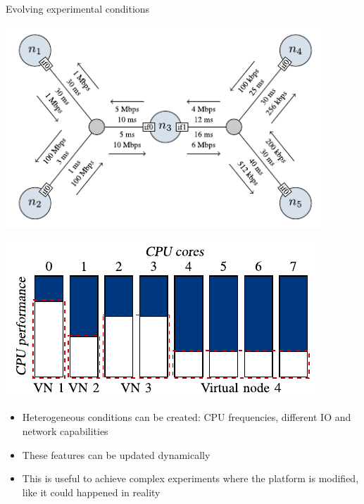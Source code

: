 \documentclass[11pt,xcolor=dvipsnames,presentation]{beamer}
\begin{document}
\begin{frame}[label=sec-4-0-5]{Evolving experimental conditions}

\begin{minipage}{0.5\textwidth}
\begin{center}
    \includegraphics[width=0.9\textwidth]{figures/links}
\end{center}\end{minipage}\hfill
\begin{minipage}{0.5\textwidth}
\begin{center}
    \includegraphics[width=\textwidth]{figures/procs}
\end{center}\end{minipage}

\begin{itemize}
\item Heterogeneous conditions can be created: CPU frequencies,
different IO and network capabilities

\item These features can be updated dynamically

\item This is useful to achieve complex experiments where the platform is modified,
like it could happened in reality
\end{itemize}
\end{frame}
\end{document}

